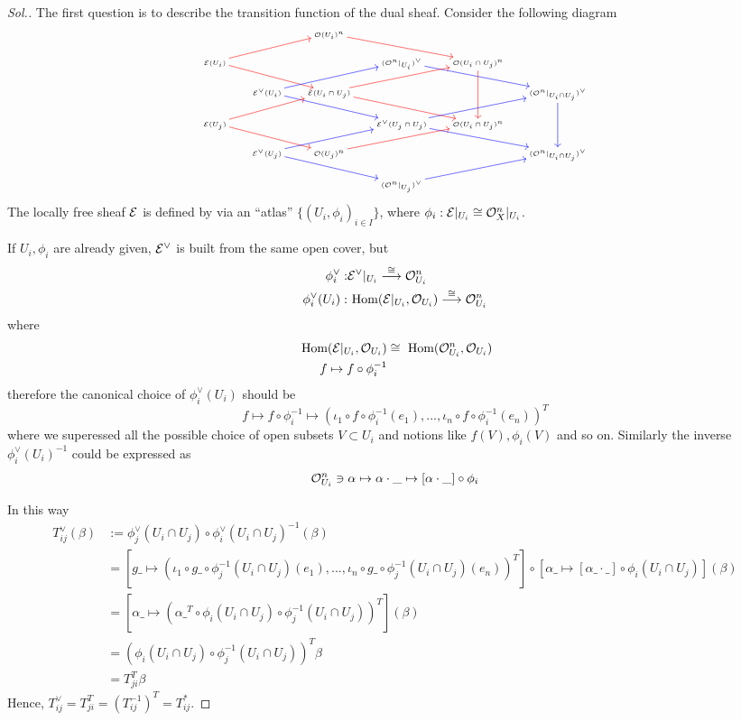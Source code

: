 \documentclass[11pt]{book} %
\begin{document}
\begin{proof}[Sol.]
The first question is to describe the transition function of the dual sheaf. Consider the following diagram
$$
\tiny
\begin{tikzcd}
 &  & \calo(U_i)^n \arrow[rrd, red] &  &  &  \\
\cale(U_i) \arrow[rru,red] \arrow[rrd,red] &  &  & (\calo^{n}|_{U_i})^{\vee} \arrow[rrd,blue] & \calo(U_i\cap U_j)^n \arrow[dd,red] &  \\
 & \cale^\vee(U_i) \arrow[rru,blue] \arrow[rrd,blue] & \cale(U_i\cap U_j) \arrow[rru,red] \arrow[rrd,red] &  &  & (\calo^n|_{U_i\cap U_j})^\vee \arrow[dd,blue] \\
\cale(U_j) \arrow[rru,red] \arrow[rrd,red] &  &  & \cale^\vee({U_j\cap U_j}) \arrow[rrd,blue] \arrow[rru,blue] & \calo(U_i\cap U_j)^n &  \\
 & \cale^\vee(U_j) \arrow[rru,blue] \arrow[rrd,blue] & \calo(U_j)^n \arrow[rru,red] &  &  & (\calo^n|_{U_i\cap U_j})^\vee \\
 &  &  & (\calo^n|_{U_j})^\vee \arrow[rru,blue] &  & 
\end{tikzcd}
$$
The locally free sheaf ${\cal E}$ is defined by via an ``atlas'' $\{(U_i,\phi_i)_{i\in I}\}$, where $\phi_i:{\cal E}|_{U_i}\cong {\cal O}_X^{n}|_{U_i}$. 

If $U_i,\phi_i$ are already given, ${\cal E}^\vee$ is built from the same open cover, but 
$$
\begin{aligned}
\phi_i^{\vee}:&{\cal E}^\vee|_{U_i}\overset{\cong}{\longrightarrow}{\cal O}_{U_i}^n\\
\phi_i^{\vee}(U_i):&\text{ Hom}({\cal E}|_{U_i},{\cal O}_{U_i})\overset{\cong}{\longrightarrow}{\cal O}_{U_i}^n
\end{aligned}
$$
where
$$
\begin{aligned}
\text{ Hom}({\cal E}|_{U_i},{\cal O}_{U_i})&\cong \text{ Hom}({\cal O}^n_{U_i},{\cal O}_{U_i})\\
f\mapsto  f\circ \phi_i^{-1}
\end{aligned}
$$
therefore the canonical choice of $\phi_i^\vee(U_i)$ should be
$$
f\mapsto f\circ \phi_i^{-1}\mapsto (\iota_1\circ f\circ \phi_i^{-1}(e_1),...,\iota_n\circ f\circ \phi_i^{-1}(e_n))^{T}
$$
where we superessed all the possible choice of open subsets $V\subset U_i$ and notions like $f(V), \phi_i(V)$ and so on.
Similarly the inverse $\phi_i^\vee(U_i)^{-1}$ could be expressed as
$$
{\cal O}_{U_i}^n\ni\alpha\mapsto \alpha\cdot\_\mapsto [\alpha\cdot\_]\circ \phi_i
$$


In this way
$$
\begin{aligned}
T^{\vee}_{ij}(\beta)&:= \phi_j^\vee(U_i\cap U_j)\circ \phi_i^\vee(U_i\cap U_j)^{-1}(\beta)\\
&=[g\_\mapsto (\iota_1\circ g\_\circ \phi_j^{-1}(U_i\cap U_j)(e_1),...,\iota_n\circ g\_\circ \phi_j^{-1}(U_i\cap U_j)(e_n))^{T}]\circ [\alpha\_\mapsto [\alpha\_\cdot\_]\circ \phi_i(U_i\cap U_j)](\beta)\\
&=[\alpha\_\mapsto (\alpha\_^{T}\circ \phi_i(U_i\cap U_j)\circ\phi_j^{-1}(U_i\cap U_j))^{T}](\beta) \\
&=(\phi_i(U_i\cap U_j)\circ\phi_j^{-1}(U_i\cap U_j))^T\beta\\
&=T_{ji}^{T}\beta
\end{aligned}
$$
Hence, $T_{ij}^\vee=T_{ji}^{T}=(T_{ij}^{-1})^{T}=T_{ij}^*$. 



\end{proof}
\end{document}
